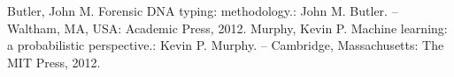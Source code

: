 \documentclass[a4paper,12pt]{article}
\begin{document}
	
	\tableofcontents \newpage

	
	\newpage
	\begin{thebibliography}{99}
		 Butler, John M. Forensic DNA typing: methodology.: John M. Butler. -- Waltham, MA, USA: Academic Press, 2012.
		 Murphy, Kevin P. Machine learning: a probabilistic perspective.: Kevin P. Murphy. -- Cambridge, Massachusetts: The MIT Press, 2012.
	\end{thebibliography}
	
	\newpage
	
\end{document}

